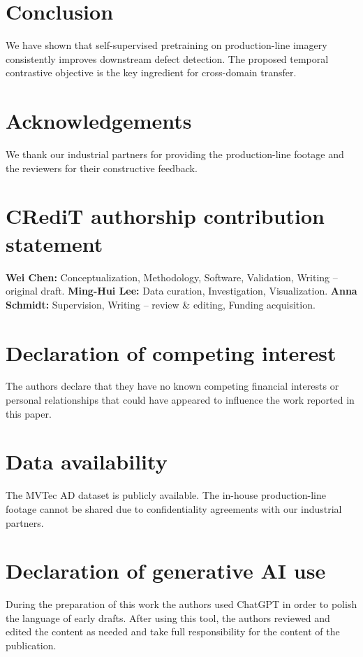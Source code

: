 \documentclass[a4paper,fleqn]{cas-dc}
\begin{document}
\section{Conclusion}

We have shown that self-supervised pretraining on production-line imagery
consistently improves downstream defect detection. The proposed temporal
contrastive objective is the key ingredient for cross-domain transfer.

\section*{Acknowledgements}

We thank our industrial partners for providing the production-line footage
and the reviewers for their constructive feedback.

\section*{CRediT authorship contribution statement}

\textbf{Wei Chen:} Conceptualization, Methodology, Software, Validation, Writing -- original draft.
\textbf{Ming-Hui Lee:} Data curation, Investigation, Visualization.
\textbf{Anna Schmidt:} Supervision, Writing -- review \& editing, Funding acquisition.

\section*{Declaration of competing interest}

The authors declare that they have no known competing financial interests
or personal relationships that could have appeared to influence the work
reported in this paper.

\section*{Data availability}

The MVTec AD dataset is publicly available. The in-house production-line
footage cannot be shared due to confidentiality agreements with our
industrial partners.

\section*{Declaration of generative AI use}

During the preparation of this work the authors used ChatGPT in order to
polish the language of early drafts. After using this tool, the authors
reviewed and edited the content as needed and take full responsibility
for the content of the publication.



\end{document}
